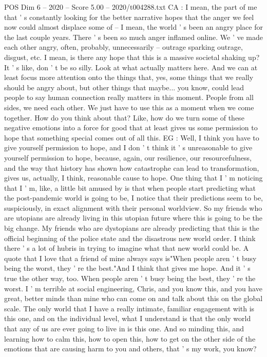 \begin{textsample}{POS Dim 6 – 2020 – Score 5.00 – 2020/t004288.txt}
CA : I mean, the part of me that ' s constantly looking for the better narrative hopes that the anger we feel now could almost displace some of -- I mean, the world ' s been an angry place for the last couple years.
There ' s been so much anger inflamed online.
We ' ve made each other angry, often, probably, unnecessarily -- outrage sparking outrage, disgust, etc.
I mean, is there any hope that this is a massive societal shaking up?
It ' s like, don ' t be so silly.
Look at what actually matters here.
And we can at least focus more attention onto the things that, yes, some things that we really should be angry about, but other things that maybe... you know, could lead people to say human connection really matters in this moment.
People from all sides, we need each other.
We just have to use this as a moment when we come together.
How do you think about that?
Like, how do we turn some of these negative emotions into a force for good that at least gives us some permission to hope that something special comes out of all this.
EG : Well, I think you have to give yourself permission to hope, and I don ' t think it ' s unreasonable to give yourself permission to hope, because, again, our resilience, our resourcefulness, and the way that history has shown how catastrophe can lead to transformation, gives us, actually, I think, reasonable cause to hope.
One thing that I ' m noticing that I ' m, like, a little bit amused by is that when people start predicting what the post-pandemic world is going to be, I notice that their predictions seem to be, suspiciously, in exact alignment with their personal worldview.
So my friends who are utopians are already living in this utopian future where this is going to be the big change.
My friends who are dystopians are already predicting that this is the official beginning of the police state and the disastrous new world order.
I think there ' s a lot of hubris in trying to imagine what that new world could be.
A quote that I love that a friend of mine always says is"When people aren ' t busy being the worst, they ' re the best."And I think that gives me hope.
And it ' s true the other way, too.
When people aren ' t busy being the best, they ' re the worst.
I ' m terrible at social engineering, Chris, and you know this, and you have great, better minds than mine who can come on and talk about this on the global scale.
The only world that I have a really intimate, familiar engagement with is this one, and on the individual level, what I understand is that the only world that any of us are ever going to live in is this one.
And so minding this, and learning how to calm this, how to open this, how to get on the other side of the emotions that are causing harm to you and others, that ' s my work, you know?

\end{textsample}

